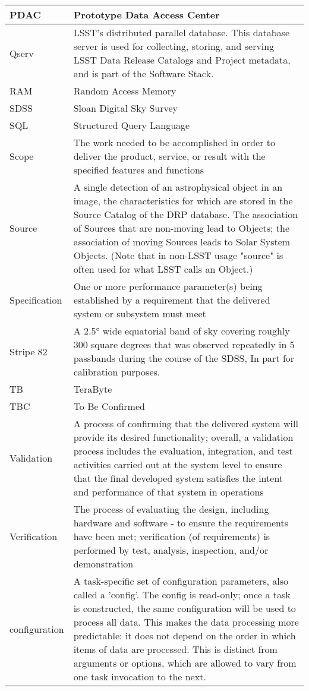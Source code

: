 \begin{longtable}{|l|p{}|}
PDAC & Prototype Data Access Center \\\hline
Qserv & LSST's distributed parallel database. This database server is used for collecting, storing, and serving LSST Data Release Catalogs and Project metadata, and is part of the Software Stack. \\\hline
RAM & Random Access Memory \\\hline
SDSS & Sloan Digital Sky Survey \\\hline
SQL & Structured Query Language \\\hline
Scope & The work needed to be accomplished in order to deliver the product, service, or result with the specified features and functions \\\hline
Source & A single detection of an astrophysical object in an image, the characteristics for which are stored in the Source Catalog of the DRP database. The association of Sources that are non-moving lead to Objects; the association of moving Sources leads to Solar System Objects. (Note that in non-LSST usage "source" is often used for what LSST calls an Object.) \\\hline
Specification & One or more performance parameter(s) being established by a requirement that the delivered system or subsystem must meet \\\hline
Stripe 82 & A 2.5° wide equatorial band of sky covering roughly 300 square degrees that was observed repeatedly in 5 passbands during the course of the SDSS, In part for calibration purposes. \\\hline
TB & TeraByte \\\hline
TBC & To Be Confirmed \\\hline
Validation & A process of confirming that the delivered system will provide its desired functionality; overall, a validation process includes the evaluation, integration, and test activities carried out at the system level to ensure that the final developed system satisfies the intent and performance of that system in operations \\\hline
Verification & The process of evaluating the design, including hardware and software - to ensure the requirements have been met;  verification (of requirements) is performed by test, analysis, inspection, and/or demonstration \\\hline
configuration & A task-specific set of configuration parameters, also called a 'config'. The config is read-only; once a task is constructed, the same configuration will be used to process all data. This makes the data processing more predictable: it does not depend on the order in which items of data are processed. This is distinct from arguments or options, which are allowed to vary from one task invocation to the next. \\\hline

\end{longtable}
